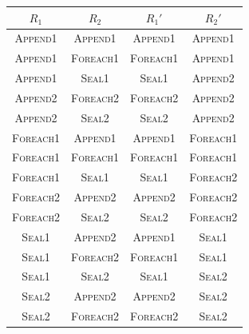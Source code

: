 \documentclass[runningheads,a4paper]{llncs}
\begin{document}
\begin{lemma}[Commutativity]
\begin{center}
\begin{tabular}{ | c | c | c | c | }
  \hline
  $R_1$ & $R_2$ & $R_1'$ & $R_2'$ \\
  \hline
  \hline
  \textsc{Append1} & \textsc{Append1} & \textsc{Append1} & \textsc{Append1} \\
  \hline
  \textsc{Append1} & \textsc{Foreach1} & \textsc{Foreach1} & \textsc{Append1} \\
  \hline
  \textsc{Append1} & \textsc{Seal1} & \textsc{Seal1} & \textsc{Append2} \\
  \hline
  \textsc{Append2} & \textsc{Foreach2} & \textsc{Foreach2} & \textsc{Append2} \\
  \hline
  \textsc{Append2} & \textsc{Seal2} & \textsc{Seal2} & \textsc{Append2} \\
  \hline
  \textsc{Foreach1} & \textsc{Append1} & \textsc{Append1} & \textsc{Foreach1} \\
  \hline
  \textsc{Foreach1} & \textsc{Foreach1} & \textsc{Foreach1} & \textsc{Foreach1} \\
  \hline
  \textsc{Foreach1} & \textsc{Seal1} & \textsc{Seal1} & \textsc{Foreach2} \\
  \hline
  \textsc{Foreach2} & \textsc{Append2} & \textsc{Append2} & \textsc{Foreach2} \\
  \hline
  \textsc{Foreach2} & \textsc{Seal2} & \textsc{Seal2} & \textsc{Foreach2} \\
  \hline
  \textsc{Seal1} & \textsc{Append2} & \textsc{Append1} & \textsc{Seal1} \\
  \hline
  \textsc{Seal1} & \textsc{Foreach2} & \textsc{Foreach1} & \textsc{Seal1} \\
  \hline
  \textsc{Seal1} & \textsc{Seal2} & \textsc{Seal1} & \textsc{Seal2} \\
  \hline
  \textsc{Seal2} & \textsc{Append2} & \textsc{Append2} & \textsc{Seal2} \\
  \hline
  \textsc{Seal2} & \textsc{Foreach2} & \textsc{Foreach2} & \textsc{Seal2} \\
  \hline
\end{tabular}
\end{center}

\end{lemma}
\end{document}
